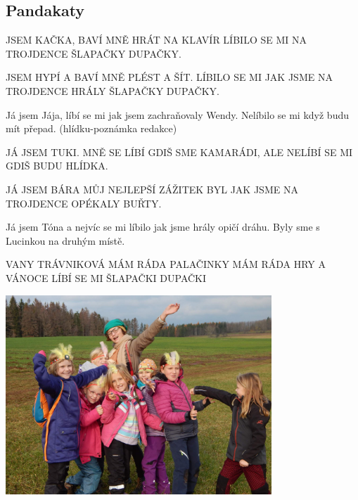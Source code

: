\subsection*{Pandakaty} %
\label{sub:pandakaty}

\begin{multicols}{2}
	

JSEM KAČKA, BAVÍ MNĚ HRÁT NA KLAVÍR
LÍBILO SE MI NA TROJDENCE ŠLAPAČKY DUPAČKY.


JSEM HYPÍ A BAVÍ MNĚ PLÉST A ŠÍT.
LÍBILO SE MI JAK JSME NA TROJDENCE HRÁLY ŠLAPAČKY DUPAČKY.


Já jsem Jája, líbí se mi jak jsem zachraňovaly Wendy. Nelíbilo se mi když budu mít přepad. (hlídku-poznámka redakce)


\columnbreak

JÁ JSEM TUKI. MNĚ SE LÍBÍ GDIŠ SME KAMARÁDI, ALE NELÍBÍ SE MI GDIŠ BUDU HLÍDKA.


JÁ JSEM BÁRA
MŮJ NEJLEPŠÍ ZÁŽITEK BYL JAK JSME NA TROJDENCE OPÉKALY BUŘTY.



Já jsem Tóna a nejvíc se mi líbilo jak jsme hrály opičí dráhu. Byly sme s Lucinkou na druhým místě.




VANY TRÁVNIKOVÁ
MÁM RÁDA PALAČINKY 
MÁM RÁDA HRY A VÁNOCE 
LÍBÍ SE MI ŠLAPAČKI DUPAČKI

\end{multicols}

\vspace*{15pt}

\begin{center}

\includegraphics[width=10cm]{img/druziny/pandakaty.jpg}

\end{center}

\clearpage


